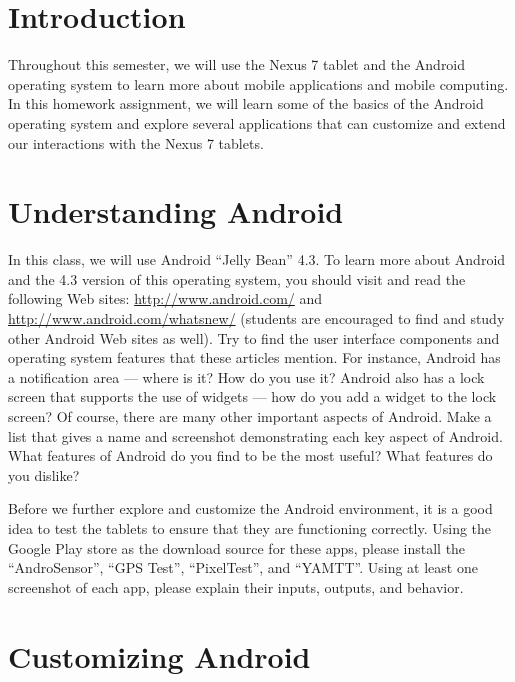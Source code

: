 

\usepackage[compact]{titlesec}



\section*{Introduction}

Throughout this semester, we will use the Nexus 7 tablet and the Android operating system to learn more about mobile
applications and mobile computing.  In this homework assignment, we will learn some of the basics of the Android
operating system and explore several applications that can customize and extend our interactions with the Nexus 7 tablets.

\section*{Understanding Android}

In this class, we will use Android ``Jelly Bean'' 4.3.  To learn more about Android and the 4.3 version of this
operating system, you should visit and read the following Web sites: \url{http://www.android.com/} and
\url{http://www.android.com/whatsnew/} (students are encouraged to find and study other Android Web sites as well). Try
to find the user interface components and operating system features that these articles mention.  For instance, Android
has a notification area --- where is it?  How do you use it? Android also has a lock screen that supports the use of
widgets --- how do you add a widget to the lock screen?  Of course, there are many other important aspects of Android.
Make a list that gives a name and screenshot demonstrating each key aspect of Android.  What features of Android do you
find to be the most useful?  What features do you dislike?

Before we further explore and customize the Android environment, it is a good idea to test the tablets to ensure that
they are functioning correctly.  Using the Google Play store as the download source for these apps, please install the
``AndroSensor'', ``GPS Test'', ``PixelTest'', and ``YAMTT''.  Using at least one screenshot of each app, please explain
their inputs, outputs, and behavior.

\section*{Customizing Android}




